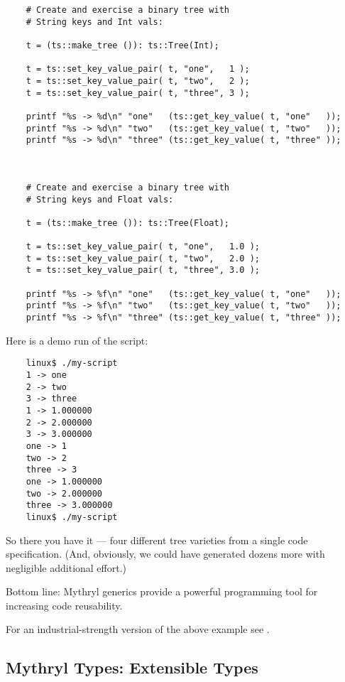\begin{verbatim}
    # Create and exercise a binary tree with
    # String keys and Int vals:

    t = (ts::make_tree ()): ts::Tree(Int);

    t = ts::set_key_value_pair( t, "one",   1 );
    t = ts::set_key_value_pair( t, "two",   2 );
    t = ts::set_key_value_pair( t, "three", 3 );

    printf "%s -> %d\n" "one"   (ts::get_key_value( t, "one"   ));
    printf "%s -> %d\n" "two"   (ts::get_key_value( t, "two"   ));
    printf "%s -> %d\n" "three" (ts::get_key_value( t, "three" ));



    # Create and exercise a binary tree with
    # String keys and Float vals:

    t = (ts::make_tree ()): ts::Tree(Float);

    t = ts::set_key_value_pair( t, "one",   1.0 );
    t = ts::set_key_value_pair( t, "two",   2.0 );
    t = ts::set_key_value_pair( t, "three", 3.0 );

    printf "%s -> %f\n" "one"   (ts::get_key_value( t, "one"   ));
    printf "%s -> %f\n" "two"   (ts::get_key_value( t, "two"   ));
    printf "%s -> %f\n" "three" (ts::get_key_value( t, "three" ));
\end{verbatim}

Here is a demo run of the script:

\begin{verbatim}
    linux$ ./my-script
    1 -> one
    2 -> two
    3 -> three
    1 -> 1.000000
    2 -> 2.000000
    3 -> 3.000000
    one -> 1
    two -> 2
    three -> 3
    one -> 1.000000
    two -> 2.000000
    three -> 3.000000
    linux$ ./my-script
\end{verbatim}

So there you have it --- four different tree varieties 
from a single code specification.  (And, obviously, we 
could have generated dozens more with negligible 
additional effort.)

Bottom line:  Mythryl generics provide a powerful programming tool for increasing 
code reusability.

For an industrial-strength version of the above example 
see .

\cutend*

\subsection{Mythryl Types:  Extensible Types}

